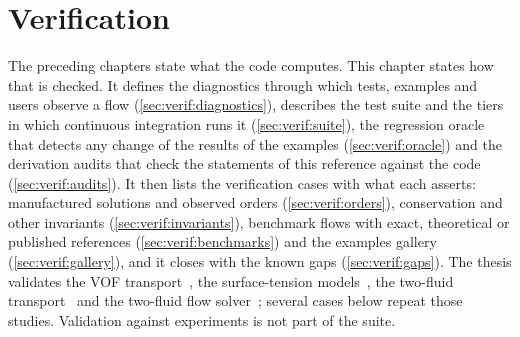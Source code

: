 \chapter{Verification}\label{ch:verification}
The preceding chapters state what the code computes. This chapter states how
that is checked. It defines the diagnostics through which tests, examples and
users observe a flow (\cref{sec:verif:diagnostics}), describes the test suite
and the tiers in which continuous integration runs it
(\cref{sec:verif:suite}), the regression oracle that detects any change of
the results of the examples (\cref{sec:verif:oracle}) and the derivation
audits that check the statements of this reference against the code
(\cref{sec:verif:audits}). It then lists the verification cases with what
each asserts: manufactured solutions and observed orders
(\cref{sec:verif:orders}), conservation and other invariants
(\cref{sec:verif:invariants}), benchmark flows with exact, theoretical or
published references (\cref{sec:verif:benchmarks}) and the examples gallery
(\cref{sec:verif:gallery}), and it closes with the known gaps
(\cref{sec:verif:gaps}). The thesis validates the VOF
transport~, the surface-tension models~, the
two-fluid transport~ and the two-fluid flow
solver~; several cases below repeat those studies. Validation
against experiments is not part of the suite.

